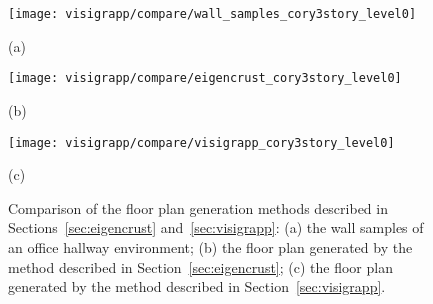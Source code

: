 \documentclass[12pt,onecolumn,oneside]{book}
\begin{document}
\begin{figure}[h]

	\centering
	\begin{minipage}[b]{0.3\linewidth}
	\centering
	\centerline{\texttt{[image: visigrapp/compare/wall\_samples\_cory3story\_level0]}}
	\centerline{(a)}
	\end{minipage}%
	\hfill
	\begin{minipage}[b]{0.3\linewidth}
	\centering
	\centerline{\texttt{[image: visigrapp/compare/eigencrust\_cory3story\_level0]}}
	\centerline{(b)}
	\end{minipage}%
	\hfill
	\begin{minipage}[b]{0.3\linewidth}
	\centering
	\centerline{\texttt{[image: visigrapp/compare/visigrapp\_cory3story\_level0]}}
	\centerline{(c)}
	\end{minipage}

	\caption[Comparison of proposed floor plan methods.]{Comparison of the floor plan generation methods described in Sections~\ref{sec:eigencrust} and~\ref{sec:visigrapp}:  (a) the wall samples of an office hallway environment; (b) the floor plan generated by the method described in Section~\ref{sec:eigencrust}; (c) the floor plan generated by the method described in Section~\ref{sec:visigrapp}.}
	\label{fig:fp_eigencrust_visigrapp_compare}

\end{figure}
\end{document}
